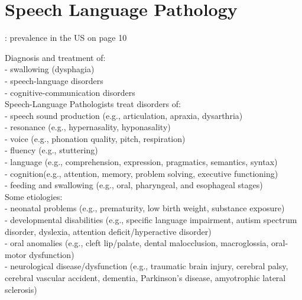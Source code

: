 \section{Speech Language Pathology}
\label{sec:SLP}
\cite{SLPathologies}: prevalence in the US on page 10

Diagnosis and treatment of:\\
- swallowing (dysphagia) \\
- speech-language disorders\\
- cognitive-communication disorders\\


Speech-Language Pathologists treat disorders of:\\
- speech sound production (e.g., articulation, apraxia, dysarthria)\\
- resonance (e.g., hypernasality, hyponasality)\\
- voice (e.g., phonation quality, pitch, respiration)\\
- fluency (e.g., stuttering)\\
- language (e.g., comprehension, expression, pragmatics, semantics, syntax)\\
- cognition(e.g., attention, memory, problem solving, executive functioning)\\
- feeding and swallowing (e.g., oral, pharyngeal, and esophageal stages) \\

Some etiologies:\\
- neonatal problems (e.g., prematurity, low birth weight, substance exposure)\\
- developmental disabilities (e.g., specific language impairment, autism spectrum
disorder, dyslexia, attention deficit/hyperactive disorder)\\
- oral anomalies (e.g., cleft lip/palate, dental malocclusion, macroglossia, oral-motor
dysfunction)\\
- neurological disease/dysfunction (e.g., traumatic brain injury, cerebral palsy, cerebral
vascular accident, dementia, Parkinson's disease, amyotrophic lateral sclerosis)\\



\begin{comment}
\section{Example glossary and acronyms}
%
%
This is the first occurrence of an abbreviation: \gls{abbrev}.

And now the second occurrence of the same abbreviation: \gls{abbrev}.

And a new acronym with capital letter: \Gls{xpt} and reused \gls{xpt}.

Lets add the term ``\gls{computer}'' to the glossary!

\end{comment}